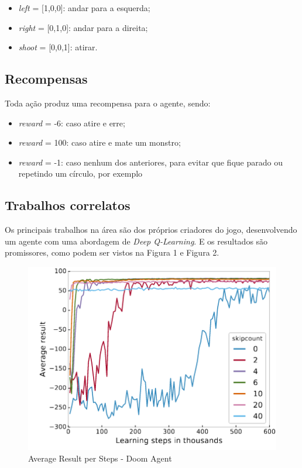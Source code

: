 \documentclass[12pt]{article}
\begin{document}
\begin{itemize}
    \item \textit{left} = [1,0,0]: andar para a esquerda;
    \item \textit{right} = [0,1,0]: andar para a direita;
    \item \textit{shoot} = [0,0,1]: atirar.
\end{itemize}

\subsection{Recompensas}

Toda ação produz uma recompensa para o agente, sendo:

\begin{itemize}
    \item \textit{reward} = -6: caso atire e erre;
    \item \textit{reward} = 100: caso atire e mate um monstro;
    \item \textit{reward} = -1: caso nenhum dos anteriores, para evitar que fique parado ou repetindo um círculo, por exemplo
\end{itemize}

\subsection{Trabalhos correlatos}

Os principais trabalhos na área são dos próprios criadores do jogo\cite{wydmuch, kempka}, desenvolvendo um agente com uma abordagem de \textit{Deep Q-Learning}. E os resultados são promissores, como podem ser vistos na Figura 1 e Figura 2.

\begin{figure}[H]
    \centering
    \includegraphics[scale=.8]{src/img/average-result-doom.png}
    \caption{Average Result per Steps - Doom Agent}
\end{figure}
\end{document}
